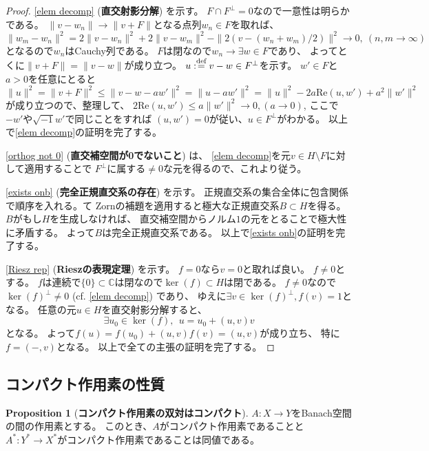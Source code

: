 \documentclass[uplatex]{jsarticle}
\theoremstyle{definition}
\newtheorem{prop}[prop]{Proposition}
\newcommand{\dfn}{:\overset{\mbox{{\scriptsize def}}}{=}}
\newcommand{\C}{\mathbb{C}}
\begin{document}
\begin{proof}
  \ref{elem decomp} (\textbf{直交射影分解}) を示す。
  \(F\cap F^{\bot} = 0\)なので一意性は明らかである。
  \(\|v-w_n\| \to \|v+F\|\)となる点列\(w_n\in F\)を取れば、
  \[
  \|w_m-w_n\|^2 = 2\|v-w_n\|^2 + 2\|v-w_m\|^2 - \|2(v-(w_n+w_m)/2)\|^2 \to 0, \
  (n,m\to \infty)
  \]
  となるので\(w_n\)はCauchy列である。
  \(F\)は閉なので\(w_n\to \exists w\in F\)であり、
  よってとくに\(\|v+F\| = \|v-w\|\)が成り立つ。
  \(u\dfn v-w\in F^{\bot}\)を示す。
  \(w'\in F\)と\(a>0\)を任意にとると
  \[
  \|u\|^2 = \|v+F\|^2 \leq \|v - w - aw'\|^2 = \| u - aw'\|^2
  = \|u\|^2 - 2a\mathrm{Re}(u,w') + a^2\|w'\|^2
  \]
  が成り立つので、整理して、
  \(2\mathrm{Re}(u,w') \leq a\|w'\|^2 \to 0, (a\to 0)\),
  ここで\(-w'\)や\(\sqrt{-1}w'\)で同じことをすれば
  \((u,w')=0\)が従い、\(u\in F^{\bot}\)がわかる。
  以上で\ref{elem decomp}の証明を完了する。

  \ref{orthog not 0} (\textbf{直交補空間が0でないこと}) は、
  \ref{elem decomp}を元\(v\in H\setminus F\)に対して適用することで
  \(F^{\bot}\)に属する\(\neq 0\)な元を得るので、これより従う。

  \ref{exists onb} (\textbf{完全正規直交系の存在}) を示す。
  正規直交系の集合全体に包含関係で順序を入れる。て
  Zornの補題を適用すると極大な正規直交系\(B\subset H\)を得る。
  \(B\)がもし\(H\)を生成しなければ、
  直交補空間からノルム\(1\)の元をとることで極大性に矛盾する。
  よって\(B\)は完全正規直交系である。
  以上で\ref{exists onb}の証明を完了する。

  \ref{Riesz rep} (\textbf{Rieszの表現定理}) を示す。
  \(f=0\)なら\(v=0\)と取れば良い。
  \(f\neq 0\)とする。
  \(f\)は連続で\(\{0\}\subset \C\)は閉なので\(\ker(f)\subset H\)は閉である。
  \(f\neq 0\)なので\(\ker(f)^{\bot}\neq 0\) (cf. \ref{elem decomp}) であり、
  ゆえに\(\exists v\in\ker(f)^{\bot}, f(v) = 1\)となる。
  任意の元\(u\in H\)を直交射影分解すると、
  \[\exists u_0\in \ker(f), \ \ u = u_0 + (u,v)v\]
  となる。
  よって\(f(u) = f(u_0) + (u,v)f(v) = (u,v)\)が成り立ち、
  特に\(f=(-,v)\)となる。
  以上で全ての主張の証明を完了する。
\end{proof}



\subsection{コンパクト作用素の性質}


\begin{prop}[\textbf{コンパクト作用素の双対はコンパクト}]
  \label{cpt dual}
  \(A:X\to Y\)をBanach空間の間の作用素とする。
  このとき、\(A\)がコンパクト作用素であることと
  \(A^*:Y^*\to X^*\)がコンパクト作用素であることは同値である。
\end{prop}
\end{document}
